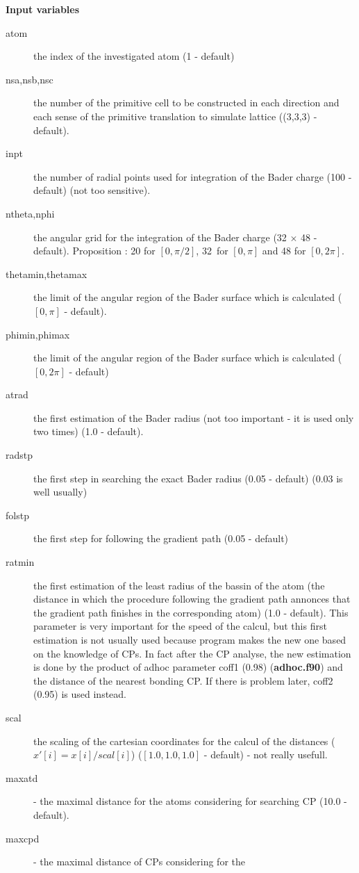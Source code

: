 \documentclass[11pt]{article}
\begin{document}
{\bf Input variables}\\  
\begin{description}
\item [atom] the index of the investigated atom (1 - default)   
\item [nsa,nsb,nsc] the number of the primitive cell to be constructed
in each direction and each sense of the primitive translation to 
simulate lattice ((3,3,3) - default).
\item [inpt] the number of radial points used for integration of the
Bader charge (100 - default) (not too sensitive).
\item [ntheta,nphi] the angular grid for the integration of the Bader
charge (32 $\times$ 48 - default). Proposition : 20 for $[0,\pi/2]$,
32~for $[0,\pi]$ and 48 for $[0,2\pi]$. 
\item [thetamin,thetamax] the limit of the angular region of the
Bader surface which is calculated ($[0,\pi]$ - default).
\item [phimin,phimax] the limit of the angular region of the
Bader surface which is calculated ($[0,2\pi]$ - default)
\item [atrad] the first estimation of the Bader radius (not too
important - it is used only two times) (1.0 - default). 
\item [radstp] the first step in searching the exact Bader radius
(0.05 - default) (0.03 is well usually)
\item [folstp] the first step for following the gradient path
(0.05 - default)
\item [ratmin] the first estimation of the least radius of the bassin of the
atom (the distance in which the procedure following the gradient path
annonces that the gradient path finishes in the corresponding atom)
(1.0 - default). This parameter is very important for the speed of the
calcul, but this first estimation is not usually used because program
makes the new one based on the knowledge of CPs. In fact after
the CP analyse, the new estimation is done by the product of adhoc
parameter coff1 (0.98) ({\bf adhoc.f90}) and the distance of the nearest
bonding CP. If there is problem later, coff2 (0.95) is used instead.
\item [scal] the scaling of the cartesian coordinates for the calcul
of the distances ($x'[i]=x[i]/scal[i]$)
($[1.0,1.0,1.0]$ - default) - not really usefull. 
\item [maxatd] - the maximal distance for the atoms considering for
searching CP (10.0 - default).
\item [maxcpd] - the maximal distance of CPs considering for the

\end{description}
\end{document}
